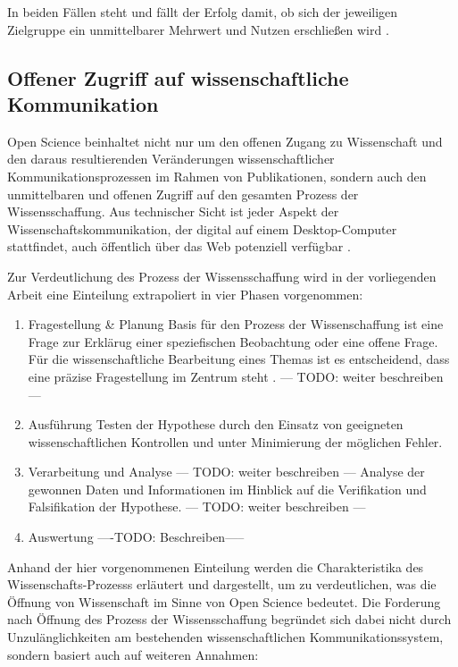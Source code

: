 In beiden Fällen steht und fällt der Erfolg damit, ob sich der jeweiligen Zielgruppe ein unmittelbarer Mehrwert und Nutzen erschließen wird \cite{schulze_2013_open}.

\subsection{Offener Zugriff auf wissenschaftliche Kommunikation}
Open Science beinhaltet nicht nur um den offenen Zugang zu Wissenschaft und den daraus resultierenden Veränderungen wissenschaftlicher Kommunikationsprozessen im Rahmen von Publikationen, sondern auch den unmittelbaren und offenen Zugriff auf den gesamten Prozess der Wissensschaffung. Aus technischer Sicht ist jeder Aspekt der Wissenschaftskommunikation, der digital auf einem Desktop-Computer stattfindet, auch öffentlich über das Web potenziell verfügbar \cite{mietchen2012wissenschaft}. 

Zur Verdeutlichung des Prozess der Wissensschaffung wird in der vorliegenden Arbeit eine Einteilung extrapoliert in vier Phasen vorgenommen:
\begin{enumerate}
\item Fragestellung & Planung
Basis für den Prozess der Wissenschaffung ist eine Frage zur Erklärug einer speziefischen Beobachtung oder eine offene Frage\cite{suchen}. Für die wissenschaftliche Bearbeitung eines Themas ist es entscheidend, dass eine präzise Fragestellung im Zentrum steht \cite{suchen}. --- TODO: weiter beschreiben ---
\item Ausführung
Testen der Hypothese durch den Einsatz von geeigneten wissenschaftlichen Kontrollen und unter Minimierung der möglichen Fehler.
\item Verarbeitung und Analyse --- TODO: weiter beschreiben ---
Analyse der gewonnen Daten und Informationen im Hinblick auf die Verifikation und Falsifikation der Hypothese. --- TODO: weiter beschreiben ---
\item Auswertung
----TODO: Beschreiben-----
\end{enumerate}

Anhand der hier vorgenommenen Einteilung werden die Charakteristika des Wissenschafts-Prozesss erläutert und dargestellt, um zu verdeutlichen, was die Öffnung von Wissenschaft im Sinne von Open Science bedeutet. Die Forderung nach Öffnung des Prozess der Wissensschaffung begründet sich dabei nicht  durch Unzulänglichkeiten am bestehenden wissenschaftlichen Kommunikationssystem, sondern basiert auch auf weiteren Annahmen:

